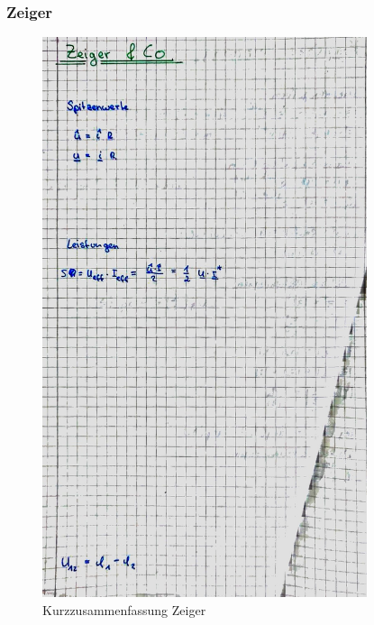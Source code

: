 \documentclass[12pt,a4paper]{article}%
\numberwithin{equation}{section}
\numberwithin{equation}{subsection}
\begin{document}
  \subsubsection{Zeiger}
\begin{figure}[H] 
	  \centering
	  \includegraphics[width=0.85\textwidth]{7_Zeiger.jpg}
	  \caption{Kurzzusammenfassung Zeiger}
	  \label{fig:Zeiger}
  \end{figure}
  \newpage
\end{document}
